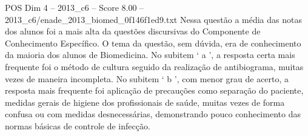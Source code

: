\begin{textsample}{POS Dim 4 – 2013\_c6 – Score 8.00 – 2013\_c6/enade\_2013\_biomed\_0f146f1ed9.txt}
Nessa questão a média das notas dos alunos foi a mais alta da questões discursivas do Componente de Conhecimento Específico.
O tema da questão, sem dúvida, era de conhecimento da maioria dos alunos de Biomedicina.
No subitem ‘ a ’, a resposta certa mais frequente foi o método de cultura seguido da realização de antibiograma, muitas vezes de maneira incompleta.
No subitem ‘ b ’, com menor grau de acerto, a resposta mais frequente foi aplicação de precauções como separação do paciente, medidas gerais de higiene dos profissionais de saúde, muitas vezes de forma confusa ou com medidas desnecessárias, demonstrando pouco conhecimento das normas básicas de controle de infecção.

\end{textsample}
